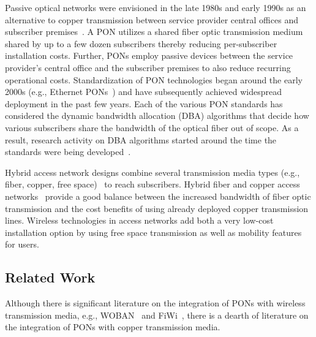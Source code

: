 \documentclass[pdftex,journal]{IEEEtran}
\begin{document}
Passive optical networks were envisioned in the late 1980s and early
1990s as an alternative to copper transmission between service
provider central offices and subscriber
premises~\cite{SBFHPO1187,FIMDDDKKDPB1194}. A PON utilizes a shared
fiber optic transmission medium shared by up to a few dozen
subscribers thereby reducing per-subscriber installation
costs. Further, PONs employ passive devices between the service
provider's central office and the subscriber premises to also reduce
recurring operational costs. Standardization of PON technologies began
around the early 2000s (e.g., Ethernet PONs~\cite{KP0202}) and have
subsequently achieved widespread deployment in the past few
years. Each of the various PON standards has considered the dynamic
bandwidth allocation (DBA) algorithms that decide how various
subscribers share the bandwidth of the optical fiber out of scope. As
a result, research activity on DBA algorithms started around the time
the standards were being
developed~\cite{dias2015off,gra2014max,KMP0202,sar2014ifa,SCAWM0309,tur2015new,ZM0709}.

Hybrid access network designs combine several transmission media types
(e.g., fiber, copper,
free space)~\cite{ahm2015ser,fan2015dem,KDRC0512,L0313} to reach
subscribers.
Hybrid fiber and copper access networks~\cite{L0313,gau2014unb}
provide a good balance between the increased bandwidth of fiber optic
transmission and the cost benefits of using already deployed copper
transmission lines. Wireless technologies in access networks
add both a very low-cost installation option by using free space transmission
as well as mobility features for users.

\subsection{Related Work}
Although there is significant literature on the integration of PONs
with wireless transmission media, e.g., WOBAN~\cite{SDM1107} and
FiWi~\cite{ahm2012rpr,GMA0209}, there is a dearth of literature on the
integration of PONs with copper transmission media.
\end{document}
